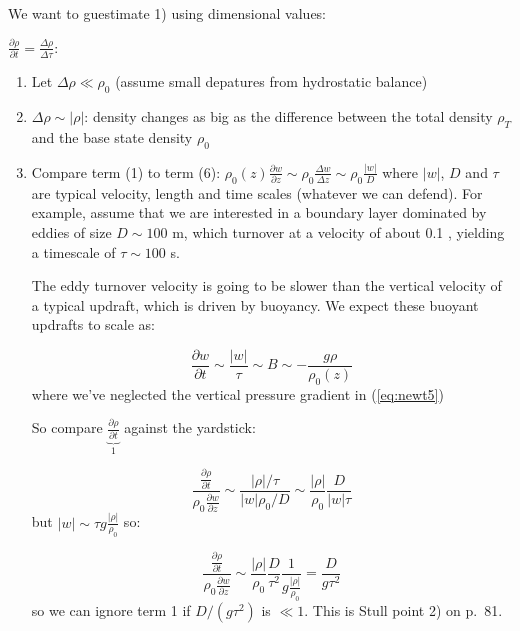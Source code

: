 \documentclass[12pt]{article}
\begin{document}
We want to guestimate 1) using dimensional values:

$\frac{\partial \rho }{\partial t} = \frac{\Delta \rho}{\Delta \tau}$:

\begin{enumerate}
\item Let $\Delta \rho \ll \rho_0$ (assume small depatures from hydrostatic balance)

\item $\Delta \rho \sim |\rho |$: density changes as big as the difference
between the total density $\rho_T$ and the base state density $\rho_0$
\item Compare term (1) to term (6): 
$\rho_0(z) \frac{\partial w }{\partial z} \sim \rho_0 \frac{\Delta w }{\Delta z}
\sim \rho_0 \frac{ |w|}{D}$  
where $|w|$, $D$ and $\tau$ are typical velocity, length and time scales
(whatever we can defend).  For example, assume that we are interested
in a boundary layer dominated by eddies of size $D \sim 100$ m,
which turnover at a velocity of about 0.1 \ms, yielding a timescale
of $\tau \sim 100$ s.  

The eddy turnover velocity is going to be slower than the vertical
velocity of a typical updraft, which is driven by buoyancy.  We expect
these buoyant updrafts to scale as:

\begin{equation}
  \label{eq:buoy}
  \frac{\partial w }{\partial t} \sim \frac{|w| }{\tau} \sim B \sim -\frac{ g \rho}{\rho_0(z)} 
\end{equation}
where we've neglected the vertical pressure gradient in (\ref{eq:newt5})

So compare $\underbrace{\frac{\partial \rho }{\partial t}}_1$ 
against the yardstick:

\begin{equation}
  \label{eq:yardstick}
  \frac{ \frac{ \partial \rho}{\partial t} }{\rho_0 \frac{ \partial w}{\partial z} } \sim 
\frac{ |\rho|/\tau}{|w|\rho_0/D} \sim
\frac{ |\rho|}{\rho_0} \frac{ D}{|w| \tau}  
\end{equation}
but $|w| \sim \tau g \frac{ |\rho|}{\rho_0}$ so:

\begin{equation}
  \label{eq:term1comp}
  \frac{ \frac{ \partial \rho}{\partial t} }{\rho_0 \frac{ \partial w}{\partial z} } \sim 
\frac{|\rho| }{\rho_0} \frac{D }{\tau^2} \frac{ 1}{g \frac{ |\rho| }{\rho_0} } 
= \frac{D }{g \tau^2} 
\end{equation}
so we can ignore term 1 if $D/(g \tau^2)$  is $\ll 1$.  This is Stull point 2) on p.~81.

\end{enumerate}
\end{document}
